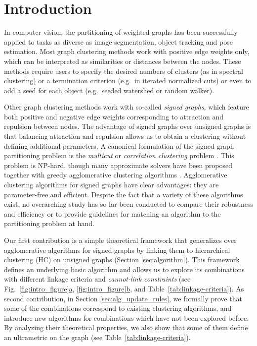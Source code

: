 \section{Introduction}
In computer vision, the partitioning of weighted graphs has been successfully applied to tasks as diverse as image segmentation, object tracking and pose estimation. 
Most graph clustering methods work with positive edge weights only, which can be interpreted as similarities or distances between the nodes. These methods require users to specify the desired numbers of clusters (as in spectral clustering) or a termination criterion (e.g.\ in iterated normalized cuts) or even to add a seed for each object  (e.g.\ seeded watershed or random walker).  

Other graph clustering methods work with so-called \emph{signed graphs}, which feature both positive and negative edge weights corresponding to attraction and repulsion between nodes. The advantage of signed graphs over unsigned graphs is that balancing attraction and repulsion allows us to obtain a clustering without defining additional parameters. A canonical formulation of the signed graph partitioning problem is the \emph{multicut} or \emph{correlation clustering} problem \cite{kappes2011globally,chopra1991multiway}. This problem is NP-hard, though many approximate solvers have been proposed \cite{lange2018combinatorial,pape2017solving,beier2016efficient,yarkony2012fast} together with greedy agglomerative clustering algorithms \cite{keuper2015efficient,levinkov2017comparative,wolf2018mutex,kardoostsolving}. 
Agglomerative clustering algorithms for signed graphs have clear advantages: they are parameter-free and efficient. Despite the fact that a variety of these algorithms exist, no overarching study has so far been conducted to compare their robustness and efficiency or to provide guidelines for matching an algorithm to the partitioning problem at hand. 


Our first contribution is a simple theoretical framework that generalizes over agglomerative algorithms for signed graphs by linking them to hierarchical clustering (HC) on unsigned graphs (Section \ref{sec:algorithm}). This framework defines an underlying basic algorithm and allows us to explore its combinations with different linkage criteria and \emph{cannot-link constraints} (see Fig.~\hyperref[fig:intro_figure]{\ref*{fig:intro_figure}a}, \hyperref[fig:intro_figure]{\ref*{fig:intro_figure}b}, and Table~\ref{tab:linkage-criteria}). 
As second contribution, in Section \ref{sec:alg_update_rules}, we formally prove that some of the combinations correspond to existing clustering algorithms, and introduce new algorithms for combinations which have not been explored before. By analyzing their theoretical properties, we also show that some of them define an ultrametric on the graph (see Table~\ref{tab:linkage-criteria}).

